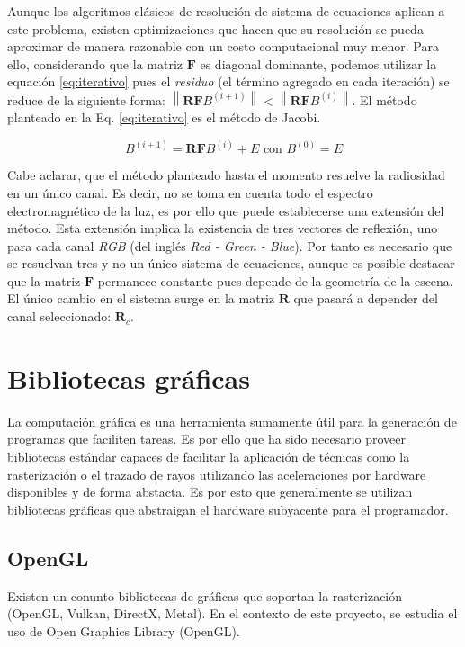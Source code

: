 Aunque los algoritmos clásicos de resolución de sistema de ecuaciones aplican a este problema, existen optimizaciones que hacen que su resolución se pueda aproximar de manera razonable con un costo computacional muy menor. Para ello, considerando que la matriz $\mathbf{F}$ es diagonal dominante, podemos utilizar la equación \ref{eq:iterativo} pues el \textit{residuo} (el término agregado en cada iteración) se reduce de la siguiente forma: $\left\|\mathbf{RF}B^{(i+1)}\right\| < \left\|\mathbf{RF}B^{(i)}\right\|$. El método planteado en la Eq. \eqref{eq:iterativo} es el método de Jacobi.

\begin{equation}
	B^{(i+1)}  = \mathbf{RF}B^{(i)}  + E \text{ con }  B^{(0)} = E
	\label{eq:iterativo}
\end{equation}

Cabe aclarar, que el método planteado hasta el momento resuelve la radiosidad en un único canal. Es decir, no se toma en cuenta todo el espectro electromagnético de la luz, es por ello que puede establecerse una extensión del método. Esta extensión implica la existencia de tres vectores de reflexión, uno para cada canal \textit{RGB} (del inglés \textit{Red - Green - Blue}). Por tanto es necesario que se resuelvan tres y no un único sistema de ecuaciones, aunque es posible destacar que la matriz $\mathbf{F}$ permanece constante pues depende de la geometría de la escena. El único cambio en el sistema surge en la matriz $\mathbf{R}$ que pasará a depender del canal seleccionado: $\mathbf{R}_{c}$.

\section{Bibliotecas gráficas}

La computación gráfica es una herramienta sumamente útil para la generación de programas que faciliten tareas. Es por ello que ha sido necesario proveer bibliotecas estándar capaces de facilitar la aplicación de técnicas como la rasterización o el trazado de rayos utilizando las aceleraciones por hardware disponibles y de forma abstacta. Es por esto que generalmente se utilizan bibliotecas gráficas que abstraigan el hardware subyacente para el programador.

\subsection{OpenGL}

Existen un conunto bibliotecas de gráficas que soportan la rasterización (OpenGL, Vulkan, DirectX, Metal). En el contexto de este proyecto, se estudia el uso de Open Graphics Library (OpenGL).

